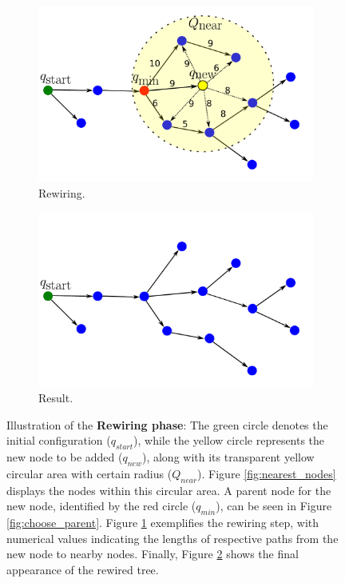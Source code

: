 \documentclass{ctuthesis}
\begin{document}
\begin{figure}[!ht]
  \begin{subfigure}[b]{0.45\textwidth}
      \includegraphics[width=\textwidth]{figChap3/RRTstarCostEvaluation40pt.pdf}
      \caption{Rewiring.}
      \label{fig:rewiring}
  \end{subfigure}
  \begin{subfigure}[b]{0.45\textwidth}
    \includegraphics[width=\textwidth]{figChap3/RRTstarFinalLook40pt.pdf}
    \caption{Result.}
    \label{fig:result}
  \end{subfigure}
  \caption{Illustration of the \textbf{Rewiring phase}: 
  The green circle denotes the initial configuration (\( q_{\textit{start}} \)), 
  while the yellow circle represents the new node to be added (\( q_{\textit{new}} \)), 
  along with its transparent yellow circular area with certain radius (\( Q_{\textit{near}} \)). 
  Figure \ref{fig:nearest_nodes} displays the nodes within this circular area. 
  A parent node for the new node, identified by the red circle (\( q_{\textit{min}} \)), 
  can be seen in Figure \ref{fig:choose_parent}. 
  Figure \ref{fig:rewiring} exemplifies the rewiring step, 
  with numerical values indicating the lengths of respective paths from the new node to nearby nodes. 
  Finally, Figure \ref{fig:result} shows the final appearance of the rewired tree.}
  \label{fig:RRTstar_explanation}
\end{figure} 
\end{document}

